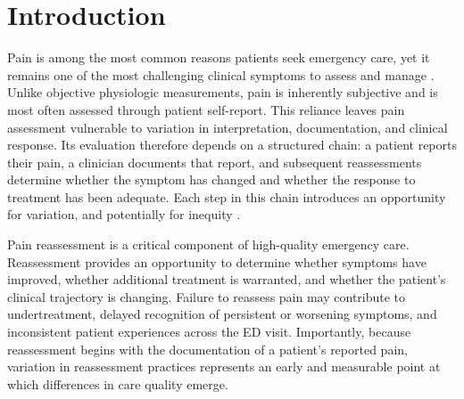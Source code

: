 \documentclass[11pt]{article}
\begin{document}
\begin{abstract}
\textbf{Conclusions:}
Pain reassessment was infrequent and delayed overall, identifying a quality gap that precedes any consideration of disparities.
Medicaid insurance was the most robust marker of slower documented reassessment, persisting across clinical, triage, workflow, severe-pain, within-acuity, and competing-risk analyses and pointing to unmeasured factors in the care encounter.
Race and ethnicity differences were less consistent as independent associations and may be partly embedded in triage and workflow pathways.
Because reassessment is directly observable and protocol-adjacent, these findings identify concrete targets for quality improvement.

\end{abstract}

\onehalfspacing

\section{Introduction}
\label{sec:introduction}

Pain is among the most common reasons patients seek emergency care, yet it remains one of the most challenging clinical symptoms to assess and manage \citep{Todd2007PEMI}.
Unlike objective physiologic measurements, pain is inherently subjective and is most often assessed through patient self-report.
This reliance leaves pain assessment vulnerable to variation in interpretation, documentation, and clinical response.
Its evaluation therefore depends on a structured chain: a patient reports their pain, a clinician documents that report, and subsequent reassessments determine whether the symptom has changed and whether the response to treatment has been adequate.
Each step in this chain introduces an opportunity for variation, and potentially for inequity \citep{Anderson2009}.

Pain reassessment is a critical component of high-quality emergency care.
Reassessment provides an opportunity to determine whether symptoms have improved, whether additional treatment is warranted, and whether the patient's clinical trajectory is changing.
Failure to reassess pain may contribute to undertreatment, delayed recognition of persistent or worsening symptoms, and inconsistent patient experiences across the ED visit.
Importantly, because reassessment begins with the documentation of a patient's reported pain, variation in reassessment practices represents an early and measurable point at which differences in care quality emerge.
\end{document}
